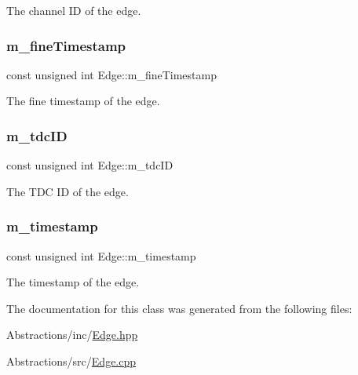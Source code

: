 The channel ID of the edge. 

\mbox{\label{class_edge_a62771c5655734e0ea5ebc8e2743130b6}} 
\subsubsection{\texorpdfstring{m\+\_\+fine\+Timestamp}{m\_fineTimestamp}}
{\footnotesize\ttfamily const unsigned int Edge\+::m\+\_\+fine\+Timestamp\hspace{0.3cm}{\ttfamily [private]}}



The fine timestamp of the edge. 

\mbox{\label{class_edge_ae6af56a9eb09e6fcc56032a7c14c6c02}} 
\subsubsection{\texorpdfstring{m\+\_\+tdc\+ID}{m\_tdcID}}
{\footnotesize\ttfamily const unsigned int Edge\+::m\+\_\+tdc\+ID\hspace{0.3cm}{\ttfamily [private]}}



The T\+DC ID of the edge. 

\mbox{\label{class_edge_a9d018b223c2f920915010a29991b3b3f}} 
\subsubsection{\texorpdfstring{m\+\_\+timestamp}{m\_timestamp}}
{\footnotesize\ttfamily const unsigned int Edge\+::m\+\_\+timestamp\hspace{0.3cm}{\ttfamily [private]}}



The timestamp of the edge. 



The documentation for this class was generated from the following files\+:\begin{DoxyCompactItemize}
\item 
Abstractions/inc/\hyperlink{_edge_8hpp}{Edge.\+hpp}\item 
Abstractions/src/\hyperlink{_edge_8cpp}{Edge.\+cpp}\end{DoxyCompactItemize}
